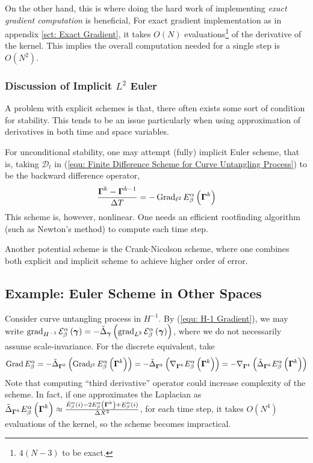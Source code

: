 \documentclass[../dissertation.tex]{subfiles}
\begin{document}
On the other hand, this is where doing the hard work of implementing \textit{exact gradient computation} is beneficial,
For exact gradient implementation as in appendix \ref{sct: Exact Gradient},
it takes $O \left( N \right)$ evaluations\footnote{$4 \left( N-3 \right)$ to be exact.} of the derivative of the kernel.
This implies the overall computation needed for a single step is $O \left( N^2 \right)$.

\subsubsection{Discussion of Implicit $L^2$ Euler}
A problem with explicit schemes is that, there often exists some sort of condition for stability.
This tends to be an issue particularly when using approximation of derivatives in both time and space variables.

For unconditional stability, one may attempt (fully) implicit Euler scheme, that is,
taking $\mathcal{D}_t$ in (\ref{equ: Finite Difference Scheme for Curve Untangling Process}) to be the backward difference operator,
\begin{equation}
    \frac{\boldsymbol{\Gamma}^{k} - \boldsymbol{\Gamma}^{k-1}}{\Delta T} = -\operatorname{Grad}_{\ell^2} E_{\beta}^{\alpha} \left( \boldsymbol{\Gamma}^k \right)
\end{equation}
This scheme is, however, nonlinear.
One needs an efficient rootfinding algorithm (such as Newton's method) to compute each time step.

Another potential scheme is the Crank-Nicolson scheme,
where one combines both explicit and implicit scheme to achieve higher order of error.

\subsection{Example: Euler Scheme in Other Spaces}
Consider curve untangling process in $H^{-1}$.
By (\ref{equ: H-1 Gradient}), we may write $\operatorname{grad}_{H^{-1}} \mathcal{E}_{\beta}^{\alpha} \left( \boldsymbol{\gamma} \right) = - \tilde{\Delta}_{\boldsymbol{\gamma}} \left( \operatorname{grad}_{L^2} \mathcal{E}_{\beta}^{\alpha} \left( \boldsymbol{\gamma} \right)\right)$,
where we do not necessarily assume scale-invariance.
For the discrete equivalent, take
\begin{equation}
    \operatorname{Grad} E_{\beta}^{\alpha} = - \tilde{\Delta}_{\boldsymbol{\Gamma}^k} \left( \operatorname{Grad}_{l^2} E_{\beta}^{\alpha} \left( \boldsymbol{\Gamma}^k \right) \right) = - \tilde{\Delta}_{\boldsymbol{\Gamma}^k} \left( \nabla_{\boldsymbol{\Gamma}^k} E_{\beta}^{\alpha} \left( \boldsymbol{\Gamma}^k \right) \right)
    = -\nabla_{\boldsymbol{\Gamma}^k} \left( \tilde{\Delta}_{\boldsymbol{\Gamma}^k} E_{\beta}^{\alpha} \left( \boldsymbol{\Gamma}^k \right) \right)
\end{equation}
Note that computing ``third derivative'' operator %
could increase complexity of the scheme.
In fact, if one approximates the Laplacian as $\curvelaplacian_{\Gammabf^k} E_{\beta}^{\alpha} \left( \Gammabf^k \right)\approx \frac{\bar{E}_{\beta}^{\alpha} (i) - 2 E_{\beta}^{\alpha} \left( \Gammabf^k \right) + \underaccent{\bar}E_{\beta}^{\alpha} (i)}{\Delta X^2}$,
for each time step, it takes $O \left( N^4 \right)$ evaluations of the kernel, so the scheme becomes impractical.
\end{document}
